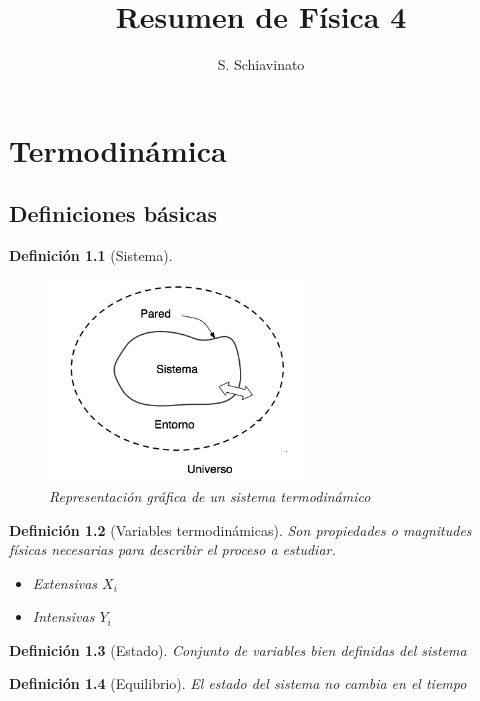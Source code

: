 \documentclass{book}
\title{Resumen de Física 4}
\author{S. Schiavinato}
\date{}
\numberwithin{equation}{section} %
\newtheorem{definition}{Definición}[chapter]
\begin{document}
\maketitle

\chapter{Termodinámica}
\section{Definiciones básicas}

\begin{definition}[Sistema]
    \begin{figure}
    \centering
    \includegraphics[width=0.6\textwidth]{termodinamica_sistema}
    \caption{Representación gráfica de un sistema termodinámico}
    \label{fig:termodinamica_sistema}
    \end{figure}
\end{definition}

\begin{definition}[Variables termodinámicas]
Son propiedades o magnitudes físicas necesarias para describir el proceso a estudiar.
\begin{itemize}
\item Extensivas $X_i$
\item Intensivas $Y_i$
\end{itemize}
\end{definition}

\begin{definition}[Estado] 
    Conjunto de variables bien definidas del sistema
\end{definition}


\begin{definition}[Equilibrio]
El estado del sistema no cambia en el tiempo
\end{definition}
\end{document}
